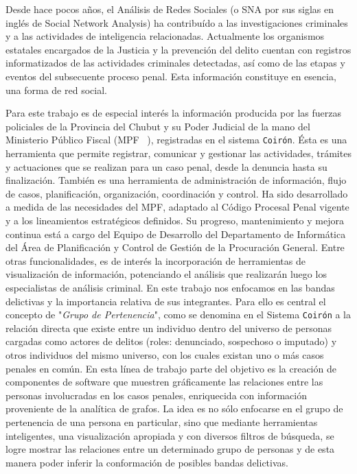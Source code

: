 \vspace{-5pt}
Desde hace pocos años, el Análisis de Redes Sociales (o SNA por sus siglas en inglés de Social Network Analysis) ha contribuído a las investigaciones criminales y a las actividades de inteligencia relacionadas.
Actualmente los organismos estatales encargados de la Justicia y la prevención del delito cuentan con registros informatizados de las actividades criminales detectadas, así como de las etapas y eventos del subsecuente proceso penal. 
Esta información constituye en esencia, una forma de red social. 

Para este trabajo es de especial interés la información producida por las fuerzas policiales de la Provincia del Chubut y su Poder Judicial de la mano del Ministerio Público Fiscal (MPF ~\cite{MPFChubutPaginaWeb}), registradas en el sistema \texttt{Coirón}. 
Ésta es una herramienta que permite registrar, comunicar y gestionar las actividades, trámites y actuaciones que se realizan para un caso penal, desde la denuncia hasta su finalización. También es una herramienta de administración de información, flujo de casos, planificación, organización, coordinación y control.
Ha sido desarrollado a medida de las necesidades del MPF, adaptado al Código Procesal Penal vigente y a los lineamientos estratégicos definidos. Su progreso, mantenimiento y mejora continua está a cargo del Equipo de Desarrollo del Departamento de Informática del Área de Planificación y Control de Gestión de la Procuración General.
Entre otras funcionalidades, es de interés la incorporación de herramientas de visualización de información, potenciando el análisis que realizarán luego los especialistas de análisis criminal.
En este trabajo nos enfocamos en las bandas delictivas y la importancia relativa de sus integrantes. 
Para ello es central el concepto de "\textit{Grupo de Pertenencia}", como se denomina en el Sistema \texttt{Coirón} a la relación directa que existe entre un individuo dentro del universo de personas cargadas como actores de delitos (roles: denunciado, sospechoso o imputado) y otros individuos del mismo universo, con los cuales existan uno o más casos penales en común.
En esta línea de trabajo parte del objetivo es la creación de componentes de software que 
muestren gráficamente las relaciones entre las personas involucradas en los casos penales, enriquecida con información proveniente de la analítica de grafos. 
La idea es no sólo enfocarse en el grupo de pertenencia de una persona en particular, sino que mediante herramientas inteligentes, una visualización apropiada y con diversos filtros de búsqueda, se logre mostrar las relaciones entre un determinado grupo de personas y de esta manera poder inferir la conformación de posibles bandas delictivas.

